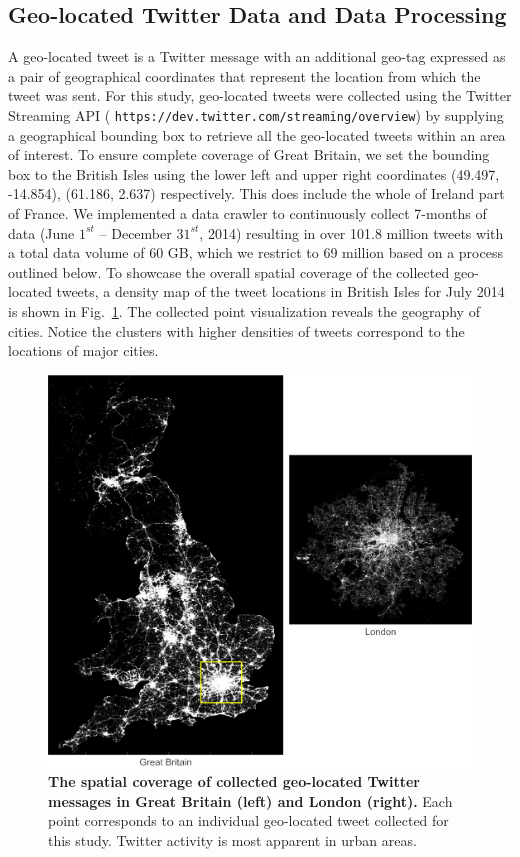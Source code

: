 \documentclass[]{tGIS2e}
\begin{document}
\subsection{Geo-located Twitter Data and Data Processing}
A geo-located tweet is a Twitter message with an additional geo-tag expressed as a pair of geographical coordinates that represent the location from which the tweet was sent.
For this study, geo-located tweets were collected using the Twitter Streaming API (
{\tt{https://dev.twitter.com/streaming/overview}}) by supplying a geographical bounding box to retrieve all the  geo-located tweets within an area of interest. To ensure complete coverage of Great Britain, we set the bounding box to the British Isles using the lower left and upper right coordinates (49.497, -14.854), (61.186, 2.637) respectively. This does include the whole of Ireland part of France.
We implemented a data crawler to continuously collect 7-months of data (June $1^{st}$ -- December $31^{st}$, 2014) resulting in over 101.8 million tweets with a total data volume of 60 GB, which we restrict to 69 million based on a process outlined below. 
To showcase the overall spatial coverage of the collected geo-located tweets, a density map of the tweet locations in British Isles for July 2014 is shown in Fig.~\ref{S2_Fig}.
The collected point visualization reveals the geography of cities.
Notice the clusters with higher densities of tweets correspond to the locations of major cities.

\begin{figure}[ht]
\begin{center}
\includegraphics[width=1.0\linewidth]{./figure/S2_twitter_density_Fig_1}
\caption{{\bf The spatial coverage of collected geo-located Twitter messages in Great Britain (left) and London (right).} Each point corresponds to an individual geo-located tweet collected for this study. Twitter activity is most apparent in urban areas.}
\label{S2_Fig}
\end{center}
\end{figure}
\end{document}
